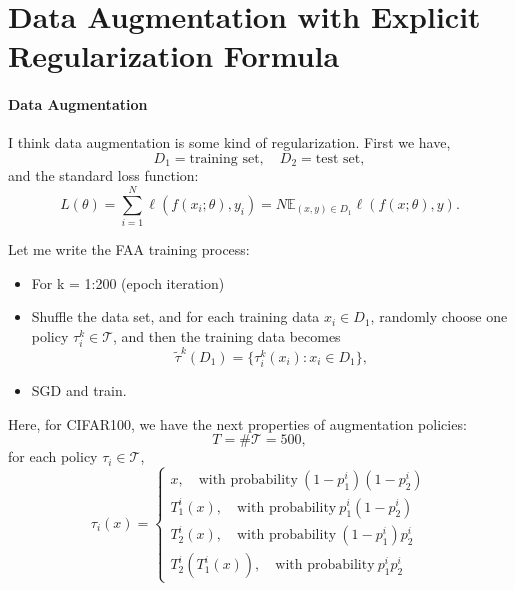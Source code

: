\newpage
\section{Data Augmentation with Explicit Regularization Formula}

\paragraph{Data Augmentation}
I think data augmentation is some kind of regularization. 
First we have,
\begin{equation}\label{key}
D_1 = \text{training set}, \quad D_2 = \text{test set},
\end{equation}
and the standard loss function:
\begin{equation}\label{key}
L(\theta) = \sum_{i=1}^N \ell( f(x_i; \theta), y_i) = N \mathbb{E}_{(x,y)\in D_1} \ell( f(x; \theta), y). 
\end{equation}

Let me write the FAA training process:
\begin{itemize}
	\item For k = 1:200 (epoch iteration)
	\item Shuffle the data set, and for each training data $x_i \in D_1$, randomly choose one policy $\tau^k_i \in \mathcal T$, and then the training data becomes 
	\begin{equation}\label{key}
	\tilde \tau^{k}(D_1) = \{ \tau^k_i(x_i): x_i \in D_1 \},
	\end{equation}
	\item SGD and train.
\end{itemize}


Here, for CIFAR100, we have the next properties of augmentation policies:
\begin{equation}\label{key}
T = \# \mathcal T = 500,
\end{equation}
for each policy $\tau_i \in \mathcal T$,
\begin{equation}\label{key}
\tau_i(x) = \begin{cases}
x, \quad \text{with probability}~(1-p^i_1)(1-p^i_2) \\
T^i_1(x), \quad \text{with probability}~p^i_1(1-p^i_2) \\
T^i_2(x), \quad \text{with probability}~(1-p^i_1)p^i_2 \\
T^i_2(T^i_1(x)), \quad \text{with probability}~ p^i_1p^i_2
\end{cases}
\end{equation}

